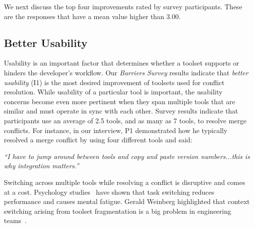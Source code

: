 We next discuss the top four improvements rated by survey participants. These are the responses that have a mean value higher than $3.00$.

\subsection{Better Usability}
Usability is an important factor that determines whether a toolset supports or hinders the developer's workflow.
Our \textit{Barriers Survey} results indicate that \textit{better usability} (I1) is the most desired improvement of toolsets used for conflict resolution. 
While usability of a particular tool is important, the usability concerns become even more pertinent when they span multiple tools that are similar and must operate in sync with each other.
Survey results indicate that participants use an average of 2.5 tools, and as many as 7 tools, to resolve merge conflicts.
For instance, in our interview, P1 demonstrated how he typically resolved a merge conflict by using four different tools and said: 
\begin{quoting}
\textit{``I have to jump around between tools and copy and paste version numbers...this is why integration matters.''}
\end{quoting}

Switching across multiple tools while resolving a conflict is disruptive and comes at a cost. 
Psychology studies~\cite{Meiran2000,gopher2000switching} have shown that task switching reduces performance and causes mental fatigue. 
Gerald Weinberg highlighted that context switching arising from toolset fragmentation is a big problem in engineering teams~\cite{Weinberg1992}. 



